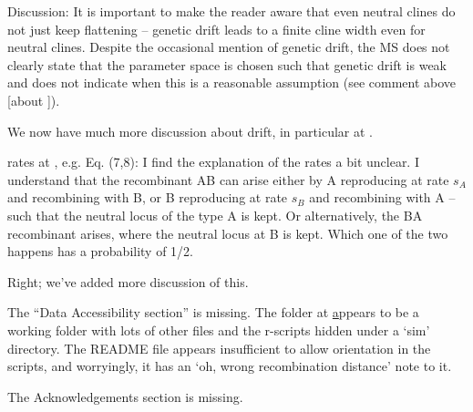 \begin{point}{Discussion:}
    It is important to make the reader aware that even neutral clines do not just keep flattening -- genetic drift leads to a finite cline width even for neutral clines. Despite the occasional mention of genetic drift, the MS does not clearly state that the parameter space is chosen such that genetic drift is weak and does not indicate when this is a reasonable assumption (see comment above [about ]).
\end{point}

\reply
We now have much more discussion about drift, in particular at \revref.


\begin{point}{rates at \revref, e.g. Eq. (7,8):}
 I find the explanation of the rates a bit unclear. I understand that the recombinant AB can arise either by A reproducing at rate $s_A$ and recombining with B, or B reproducing at rate $s_B$ and recombining with A -- such that the neutral locus of the type A is kept. Or alternatively, the BA recombinant arises, where the neutral locus at B is kept. Which one of the two happens has a probability of 1/2.
\end{point}

\reply
Right; we've added more discussion of this.

\begin{point}{}
The ``Data Accessibility section'' is missing. The folder at \href{http://github.com_petrelharp_clinal-lineages}  appears to be a working folder with lots of other files and the r-scripts hidden under a `sim' directory. The README file appears insufficient to allow orientation in the scripts, and worryingly, it has an `oh, wrong recombination distance' note to it.
\end{point}

\reply
{}

\begin{point}{}
The Acknowledgements section is missing.
\end{point}

